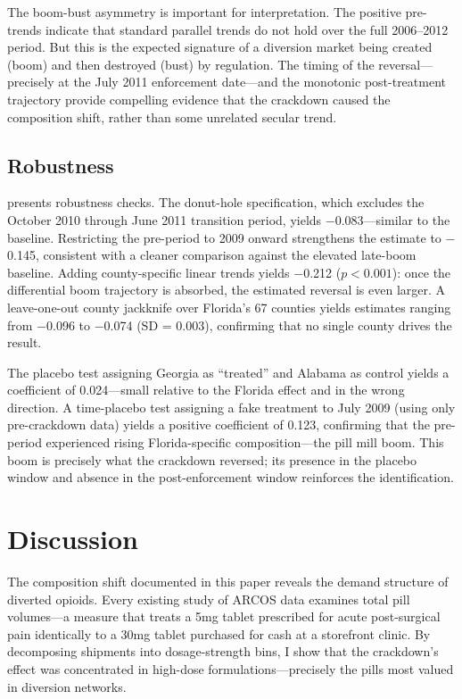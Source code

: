 \documentclass[12pt]{article}
\begin{document}
The boom-bust asymmetry is important for interpretation. The positive pre-trends indicate that standard parallel trends do not hold over the full 2006--2012 period. But this is the expected signature of a diversion market being created (boom) and then destroyed (bust) by regulation. The timing of the reversal---precisely at the July 2011 enforcement date---and the monotonic post-treatment trajectory provide compelling evidence that the crackdown caused the composition shift, rather than some unrelated secular trend.

\subsection{Robustness}



 presents robustness checks. The donut-hole specification, which excludes the October 2010 through June 2011 transition period, yields $-$0.083---similar to the baseline. Restricting the pre-period to 2009 onward strengthens the estimate to $-$0.145, consistent with a cleaner comparison against the elevated late-boom baseline. Adding county-specific linear trends yields $-$0.212 ($p < 0.001$): once the differential boom trajectory is absorbed, the estimated reversal is even larger. A leave-one-out county jackknife over Florida's 67 counties yields estimates ranging from $-$0.096 to $-$0.074 (SD = 0.003), confirming that no single county drives the result.

The placebo test assigning Georgia as ``treated'' and Alabama as control yields a coefficient of 0.024---small relative to the Florida effect and in the wrong direction. A time-placebo test assigning a fake treatment to July 2009 (using only pre-crackdown data) yields a positive coefficient of 0.123, confirming that the pre-period experienced rising Florida-specific composition---the pill mill boom. This boom is precisely what the crackdown reversed; its presence in the placebo window and absence in the post-enforcement window reinforces the identification.


\section{Discussion}

The composition shift documented in this paper reveals the demand structure of diverted opioids. Every existing study of ARCOS data examines total pill volumes---a measure that treats a 5mg tablet prescribed for acute post-surgical pain identically to a 30mg tablet purchased for cash at a storefront clinic. By decomposing shipments into dosage-strength bins, I show that the crackdown's effect was concentrated in high-dose formulations---precisely the pills most valued in diversion networks.
\end{document}
